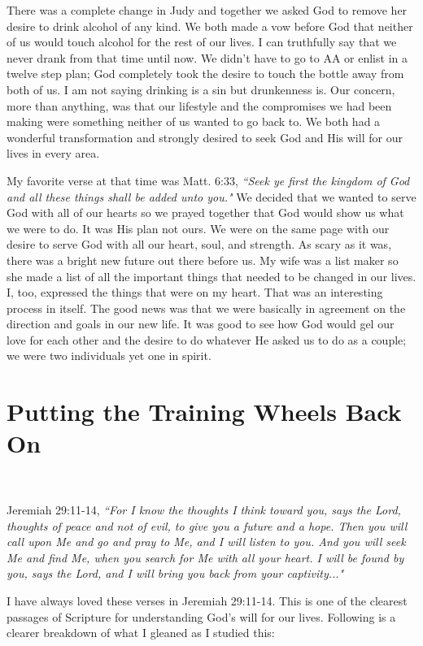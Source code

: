 \documentclass[oneside,12pt]{book}
\begin{document}
There was a complete change in Judy and together we asked God to remove her desire to drink alcohol of any kind. We both made a vow before God that neither of us would touch alcohol for the rest of our lives. I can truthfully say that we never drank from that time until now. We didn't have to go to AA or enlist in a twelve step plan; God completely took the desire to touch the bottle away from both of us. I am not saying drinking is a sin but drunkenness is. Our concern, more than anything, was that our lifestyle and the compromises we had been making were something neither of us wanted to go back to. We both had a wonderful transformation and strongly desired to seek God and His will for our lives in every area.

My favorite verse at that time was Matt. 6:33, \textit{``Seek ye first the kingdom of God and all these things shall be added unto you."} We decided that we wanted to serve God with all of our hearts so we prayed together that God would show us what we were to do. It was His plan not ours. We were on the same page with our desire to serve God with all our heart, soul, and strength. As scary as it was, there was a bright new future out there before us. My wife was a list maker so she made a list of all the important things that needed to be changed in our lives. I, too, expressed the things that were on my heart. That was an interesting process in itself. The good news was that we were basically in agreement on the direction and goals in our new life. It was good to see how God would gel our love for each other and the desire to do whatever He asked us to do as a couple; we were two individuals yet one in spirit.


\section{Putting the Training Wheels Back On}
\

Jeremiah 29:11-14, \textit{``For I know the thoughts I think toward you, says the Lord, thoughts of peace and not of evil, to give you a future and a hope. Then you will call upon Me and go and pray to Me, and I will listen to you. And you will seek Me and find Me, when you search for Me with all your heart. I will be found by you, says the Lord, and I will bring you back from your captivity..."}

I have always loved these verses in Jeremiah 29:11-14. This is one of the clearest passages of Scripture for understanding God's will for our lives. Following is a clearer breakdown of what I gleaned as I studied this:
	
\end{document}
